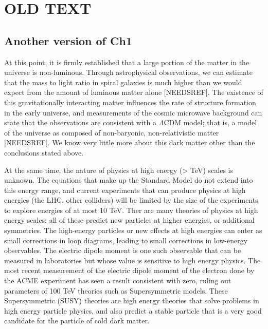 \documentclass[12pt,twosides]{book}
\begin{document}
\section{OLD TEXT}
\subsection{Another version of Ch1}
At this point, it is firmly established that a large portion of the matter in the universe is non-luminous. Through astrophysical observations, we can estimate that the mass to light ratio in spiral galaxies is much higher than we would expect from the amount of luminous matter alone [NEEDSREF]. The existence of this gravitationally interacting matter influences the rate of structure formation in the early universe, and measurements of the cosmic microwave background can state that the observations are consistent with a $\Lambda$CDM model; that is, a model of the universe as composed of non-baryonic, non-relativistic matter [NEEDSREF]. We know very little more about this dark matter other than the conclusions stated above.

At the same time, the nature of physics at high energy (> TeV) scales is unknown. The equations that make up the Standard Model do not extend into this energy range, and current experiments that can produce physics at high energies (the LHC, other colliders) will be limited by the size of the experiments to explore energies of at most 10 TeV. Ther are many theories of physics at high energy scales; all of these predict new particles at higher energies, or additional symmetries. The high-energy particles or new effects at high energies can enter as small corrections in loop diagrams, leading to small corrections in low-energy observables. The electric dipole moment is one such observable that can be measured in laboratories but whose value is sensitive to high energy physics. The most recent measurement of the electric dipole moment of the electron \cite{acme14} done by the ACME experiment has seen a result consistent with zero, ruling out parameters of 100 TeV theories such as Supersymmetric models. These Supersymmetric (SUSY) theories are high energy theories that solve problems in high energy particle physics, and also predict a stable particle that is a very good candidate for the particle of cold dark matter.
\end{document}
